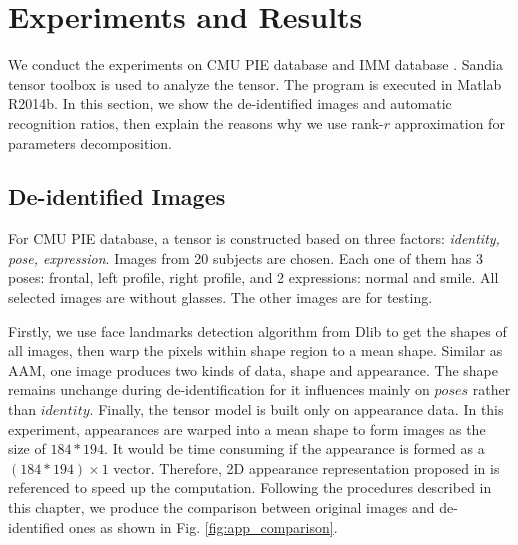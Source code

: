 \section{Experiments and Results}

We conduct the experiments on CMU PIE database \cite{PIE01} and IMM database \cite{IMM04}. 
Sandia tensor toolbox \cite{TTB15} is used to analyze the tensor. The program is executed in 
Matlab R2014b. In this section, we show the de-identified images and automatic recognition
ratios, then explain the reasons why we use rank-$r$ approximation for parameters decomposition. 

\subsection{De-identified Images}
For CMU PIE database, a tensor is constructed based on three factors: {\it identity, pose, expression}.
Images from 20 subjects are chosen. Each one of them has 3 poses: frontal, left profile, right profile, 
and 2 expressions: normal and smile. All selected images are without glasses. The other images are 
for testing. 

Firstly, we use face landmarks detection algorithm from Dlib to get the shapes of all images, 
then warp the pixels within shape region to a mean shape. Similar as AAM, one image produces two kinds 
of data, shape and appearance. The shape remains unchange during de-identification for it influences
mainly on $poses$ rather than $identity$. Finally, the tensor model is built only on appearance data.
In this experiment, appearances are warped into a mean shape to form images as the size of $184*194$.
It would be time consuming if the appearance is formed as a $(184*194) \times 1$ vector. Therefore, 2D
appearance representation proposed in \cite{Feng12} is referenced to speed up the computation. Following
the procedures described in this chapter, we produce the comparison between original
images and de-identified ones as shown in Fig. \ref{fig:app_comparison}.


